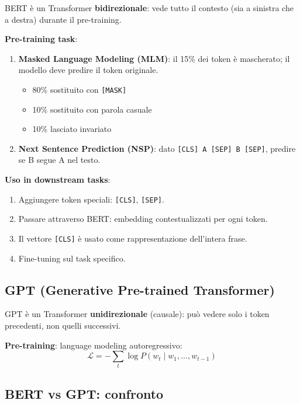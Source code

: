 \documentclass[12pt,a4paper]{article}
\begin{document}
\begin{defbox}
BERT è un Transformer \textbf{bidirezionale}: vede tutto il contesto (sia a sinistra che a destra) durante il pre-training.
\end{defbox}

\textbf{Pre-training task}:

\begin{enumerate}[leftmargin=1.5em, label=\arabic*.]
  \item \textbf{Masked Language Modeling (MLM)}: il 15\% dei token è mascherato; il modello deve predire il token originale.
  \begin{itemize}[leftmargin=1.5em, nosep]
    \item 80\% sostituito con \texttt{[MASK]}
    \item 10\% sostituito con parola casuale
    \item 10\% lasciato invariato
  \end{itemize}
  \item \textbf{Next Sentence Prediction (NSP)}: dato \texttt{[CLS] A [SEP] B [SEP]}, predire se B segue A nel testo.
\end{enumerate}

\textbf{Uso in downstream tasks}:
\begin{enumerate}[leftmargin=1.5em, label=\arabic*., nosep]
  \item Aggiungere token speciali: \texttt{[CLS]}, \texttt{[SEP]}.
  \item Passare attraverso BERT: embedding contestualizzati per ogni token.
  \item Il vettore \texttt{[CLS]} è usato come rappresentazione dell'intera frase.
  \item Fine-tuning sul task specifico.
\end{enumerate}

\subsection{GPT (Generative Pre-trained Transformer)}

\begin{defbox}
GPT è un Transformer \textbf{unidirezionale} (causale): può vedere solo i token precedenti, non quelli successivi.
\end{defbox}

\textbf{Pre-training}: language modeling autoregressivo:
\[
\mathcal{L} = -\sum_{t} \log P(w_t \mid w_1, \dots, w_{t-1})
\]

\subsection{BERT vs GPT: confronto}
\end{document}

